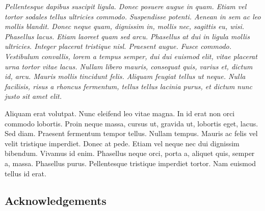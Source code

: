 \documentclass[aps, prl, twocolumn, superscriptaddress, final]{revtex4}
\begin{document}
{
  \it
Pellentesque dapibus suscipit ligula.  Donec posuere augue in quam.  Etiam vel tortor sodales tellus ultricies commodo.  Suspendisse potenti.  Aenean in sem ac leo mollis blandit.  Donec neque quam, dignissim in, mollis nec, sagittis eu, wisi.  Phasellus lacus.  Etiam laoreet quam sed arcu.  Phasellus at dui in ligula mollis ultricies.  Integer placerat tristique nisl.  Praesent augue.  Fusce commodo.  Vestibulum convallis, lorem a tempus semper, dui dui euismod elit, vitae placerat urna tortor vitae lacus.  Nullam libero mauris, consequat quis, varius et, dictum id, arcu.  Mauris mollis tincidunt felis.  Aliquam feugiat tellus ut neque.  Nulla facilisis, risus a rhoncus fermentum, tellus tellus lacinia purus, et dictum nunc justo sit amet elit.

Aliquam erat volutpat.  Nunc eleifend leo vitae magna.  In id erat non orci commodo lobortis.  Proin neque massa, cursus ut, gravida ut, lobortis eget, lacus.  Sed diam.  Praesent fermentum tempor tellus.  Nullam tempus.  Mauris ac felis vel velit tristique imperdiet.  Donec at pede.  Etiam vel neque nec dui dignissim bibendum.  Vivamus id enim.  Phasellus neque orci, porta a, aliquet quis, semper a, massa.  Phasellus purus.  Pellentesque tristique imperdiet tortor.  Nam euismod tellus id erat.
}

\subsection{Acknowledgements}



\end{document}
